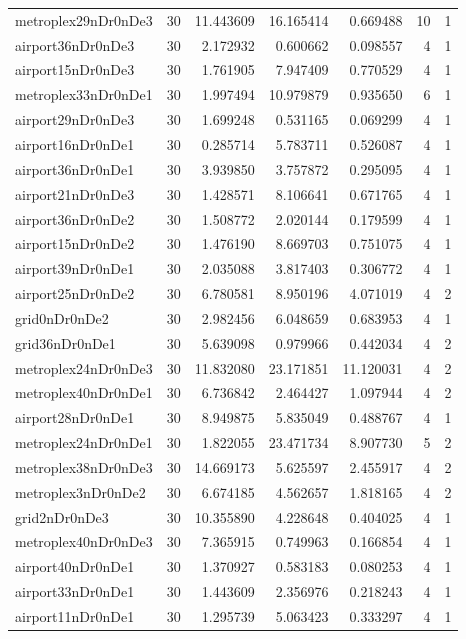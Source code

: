 \documentclass[../../../thesis.tex]{subfiles}
\begin{document}
\begin{longtable}{|l|r|r|r|r|r|r|}
metroplex29nDr0nDe3 & 30 & 11.443609 & 16.165414 & 0.669488 & 10 & 1 \\
airport36nDr0nDe3 & 30 & 2.172932 & 0.600662 & 0.098557 & 4 & 1 \\
airport15nDr0nDe3 & 30 & 1.761905 & 7.947409 & 0.770529 & 4 & 1 \\
metroplex33nDr0nDe1 & 30 & 1.997494 & 10.979879 & 0.935650 & 6 & 1 \\
airport29nDr0nDe3 & 30 & 1.699248 & 0.531165 & 0.069299 & 4 & 1 \\
airport16nDr0nDe1 & 30 & 0.285714 & 5.783711 & 0.526087 & 4 & 1 \\
airport36nDr0nDe1 & 30 & 3.939850 & 3.757872 & 0.295095 & 4 & 1 \\
airport21nDr0nDe3 & 30 & 1.428571 & 8.106641 & 0.671765 & 4 & 1 \\
airport36nDr0nDe2 & 30 & 1.508772 & 2.020144 & 0.179599 & 4 & 1 \\
airport15nDr0nDe2 & 30 & 1.476190 & 8.669703 & 0.751075 & 4 & 1 \\
airport39nDr0nDe1 & 30 & 2.035088 & 3.817403 & 0.306772 & 4 & 1 \\
airport25nDr0nDe2 & 30 & 6.780581 & 8.950196 & 4.071019 & 4 & 2 \\
grid0nDr0nDe2 & 30 & 2.982456 & 6.048659 & 0.683953 & 4 & 1 \\
grid36nDr0nDe1 & 30 & 5.639098 & 0.979966 & 0.442034 & 4 & 2 \\
metroplex24nDr0nDe3 & 30 & 11.832080 & 23.171851 & 11.120031 & 4 & 2 \\
metroplex40nDr0nDe1 & 30 & 6.736842 & 2.464427 & 1.097944 & 4 & 2 \\
airport28nDr0nDe1 & 30 & 8.949875 & 5.835049 & 0.488767 & 4 & 1 \\
metroplex24nDr0nDe1 & 30 & 1.822055 & 23.471734 & 8.907730 & 5 & 2 \\
metroplex38nDr0nDe3 & 30 & 14.669173 & 5.625597 & 2.455917 & 4 & 2 \\
metroplex3nDr0nDe2 & 30 & 6.674185 & 4.562657 & 1.818165 & 4 & 2 \\
grid2nDr0nDe3 & 30 & 10.355890 & 4.228648 & 0.404025 & 4 & 1 \\
metroplex40nDr0nDe3 & 30 & 7.365915 & 0.749963 & 0.166854 & 4 & 1 \\
airport40nDr0nDe1 & 30 & 1.370927 & 0.583183 & 0.080253 & 4 & 1 \\
airport33nDr0nDe1 & 30 & 1.443609 & 2.356976 & 0.218243 & 4 & 1 \\
airport11nDr0nDe1 & 30 & 1.295739 & 5.063423 & 0.333297 & 4 & 1 \\

\end{longtable}
\end{document}
